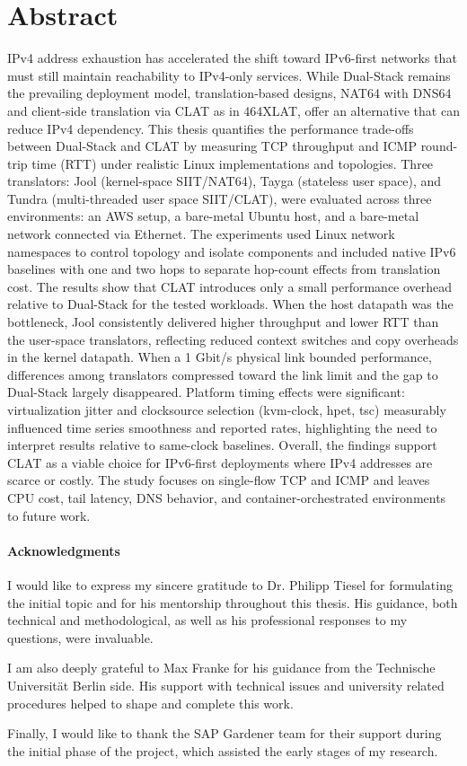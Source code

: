 \section*{Abstract}
IPv4 address exhaustion has accelerated the shift toward IPv6-first networks that must still maintain reachability to IPv4-only services. While Dual-Stack remains the prevailing deployment model, translation-based designs, NAT64 with DNS64 and client-side translation via CLAT as in 464XLAT, offer an alternative that can reduce IPv4 dependency. This thesis quantifies the performance trade-offs between Dual-Stack and CLAT by measuring TCP throughput and ICMP round-trip time (RTT) under realistic Linux implementations and topologies. Three translators: Jool (kernel-space SIIT/NAT64), Tayga (stateless user space), and Tundra (multi-threaded user space SIIT/CLAT), were evaluated across three environments: an AWS setup, a bare-metal Ubuntu host, and a bare-metal network connected via Ethernet. The experiments used Linux network namespaces to control topology and isolate components and included native IPv6 baselines with one and two hops to separate hop-count effects from translation cost.
The results show that CLAT introduces only a small performance overhead relative to Dual-Stack for the tested workloads. When the host datapath was the bottleneck, Jool consistently delivered higher throughput and lower RTT than the user-space translators, reflecting reduced context switches and copy overheads in the kernel datapath. When a 1 Gbit/s physical link bounded performance, differences among translators compressed toward the link limit and the gap to Dual-Stack largely disappeared. Platform timing effects were significant: virtualization jitter and clocksource selection (kvm-clock, hpet, tsc) measurably influenced time series smoothness and reported rates, highlighting the need to interpret results relative to same-clock baselines. Overall, the findings support CLAT as a viable choice for IPv6-first deployments where IPv4 addresses are scarce or costly. The study focuses on single-flow TCP and ICMP and leaves CPU cost, tail latency, DNS behavior, and container-orchestrated environments to future work.



\paragraph{Acknowledgments}
I would like to express my sincere gratitude to Dr. Philipp Tiesel for formulating the initial topic and for his mentorship throughout this thesis. His guidance, both technical and methodological, as well as his professional responses to my questions, were invaluable.

I am also deeply grateful to Max Franke for his guidance from the Technische Universität Berlin side. His support with technical issues and university related procedures helped to shape and complete this work.

Finally, I would like to thank the SAP Gardener team for their support during the initial phase of the project, which assisted the early stages of my research.
